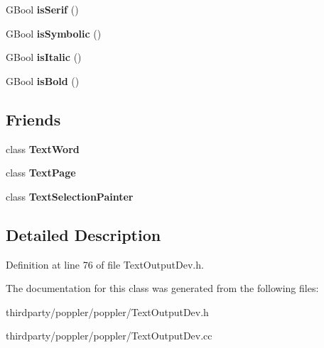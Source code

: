 \begin{DoxyCompactItemize}
G\+Bool {\bfseries is\+Serif} ()
\item 
\mbox{\label{class_text_font_info_a56e16d0f4abba52c1a7f652411cc2aae}} 
G\+Bool {\bfseries is\+Symbolic} ()
\item 
\mbox{\label{class_text_font_info_a9d0e384b41ddcc35d78a9541f0c06fbb}} 
G\+Bool {\bfseries is\+Italic} ()
\item 
\mbox{\label{class_text_font_info_a3f51aab43c5084a7e0effe9f695320e1}} 
G\+Bool {\bfseries is\+Bold} ()
\end{DoxyCompactItemize}
\subsection*{Friends}
\begin{DoxyCompactItemize}
\item 
\mbox{\label{class_text_font_info_a205f228e79a9b6aa67bbb27244edb47b}} 
class {\bfseries Text\+Word}
\item 
\mbox{\label{class_text_font_info_aabfaf949a35dc7fec076efc8f20054a8}} 
class {\bfseries Text\+Page}
\item 
\mbox{\label{class_text_font_info_a478e1ac9857fe7ba0b2079ce49d24e78}} 
class {\bfseries Text\+Selection\+Painter}
\end{DoxyCompactItemize}


\subsection{Detailed Description}


Definition at line 76 of file Text\+Output\+Dev.\+h.



The documentation for this class was generated from the following files\+:\begin{DoxyCompactItemize}
\item 
thirdparty/poppler/poppler/Text\+Output\+Dev.\+h\item 
thirdparty/poppler/poppler/Text\+Output\+Dev.\+cc\end{DoxyCompactItemize}
